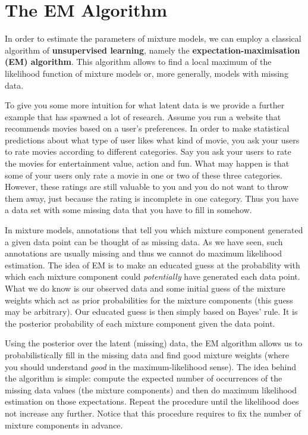 \section{The EM Algorithm}

In order to estimate the parameters of mixture models, we can employ a classical algorithm of 
\textbf{unsupervised learning}, namely the \textbf{expectation-maximisation (EM) algorithm}. This
algorithm allows to find a local maximum of the likelihood function of mixture models or, more
generally, models with missing data. 

To give you some more intuition for what latent data is we provide a further example that has
spawned a lot of research. Assume you run a website that recommends movies
based on a user's preferences. In order to make statistical predictions about what type of user
likes what kind of movie, you ask your users to rate movies according to different categories.
Say you ask your users to rate the movies for entertainment value, action and fun. What may happen is
that some of your users only rate a movie in one or two of these three categories. However, these
ratings are still valuable to you and you do not want to throw them away, just because the rating is
incomplete in one category. Thus you have a data set with some missing data that you have to fill in somehow.

In mixture models, annotations that tell you which mixture component
generated a given data point can be thought of as missing data. As we have seen, such annotations
are usually missing and thus we cannot do maximum likelihood estimation. The idea of EM is to
make an educated guess at the probability with which each mixture component could \textit{potentially}
have generated each data point. What we do know is our observed data and some initial guess of the mixture
weights which act as prior probabilities for the mixture components (this guess may be arbitrary). 
Our educated guess is then simply based on Bayes' rule. It is the posterior probability of each mixture
component given the data point.

Using the posterior over the latent (missing) data, the EM algorithm allows us to probabilistically fill in the missing data and find good mixture weights
(where you should understand \textit{good} in the maximum-likelihood sense). The idea behind the
algorithm is simple: compute the expected number of occurrences of the missing data values (the mixture 
components) and then do maximum likelihood estimation on those expectations. Repeat the procedure 
until the likelihood does not increase any further. Notice that this procedure requires to
fix the number of mixture components in advance.

